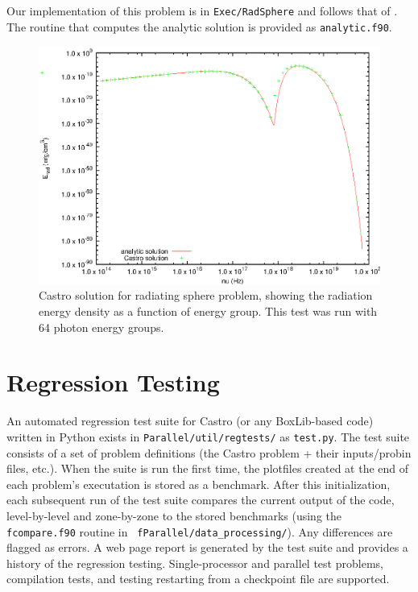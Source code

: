 Our implementation of this problem is in {\tt Exec/RadSphere} and
follows that of \cite{swestymyra:2009}.  The routine that computes
the analytic solution is provided as {\tt analytic.f90}.

\begin{figure}[h]
\centering
\includegraphics[width=5.0in]{CastroVerification/radiating_sphere}
\caption{\label{fig:radsphere} Castro solution for radiating sphere problem,
  showing the radiation energy density as a function of energy group.
  This test was run with 64 photon energy groups.}
\end{figure}


\section{Regression Testing}

An automated regression test suite for Castro (or any BoxLib-based
code) written in Python exists in {\tt Parallel/util/regtests/} as
{\tt test.py}.  The test suite consists of a set of problem
definitions (the Castro problem + their inputs/probin files, etc.).
When the suite is run the first time, the plotfiles created at the end
of each problem's executation is stored as a benchmark.  After this
initialization, each subsequent run of the test suite compares the
current output of the code, level-by-level and zone-by-zone to the
stored benchmarks (using the {\tt fcompare.f90} routine in {\tt
  fParallel/data\_processing/}).  Any differences are flagged as
errors.  A web page report is generated by the test suite and provides
a history of the regression testing.  Single-processor and parallel
test problems, compilation tests, and testing restarting from a
checkpoint file are supported.

